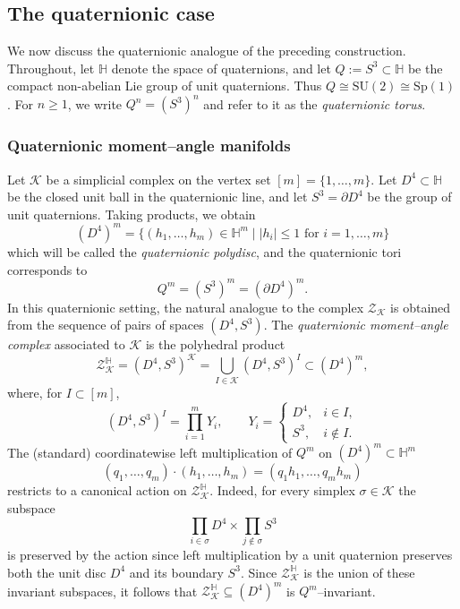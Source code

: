 \documentclass[11pt,a4paper]{article}
\numberwithin{equation}{section}
\theoremstyle{named}
\begin{document}
\subsection{The quaternionic case}
\label{subsec:quaternionic_case}

We now discuss the quaternionic analogue of the preceding construction. Throughout, let $\mathbb H$ denote the space of quaternions, and let $Q:=S^3\subset \mathbb H$ be the compact non-abelian Lie group of unit quaternions. Thus $Q\cong \mathrm{SU}(2)\cong \mathrm{Sp}(1)$. For $n\ge 1$, we write $Q^n=(S^3)^n$ and refer to it as the \emph{quaternionic torus}. 


\subsubsection{Quaternionic moment--angle manifolds}
\label{sec:moment_angle_H}

Let \(\mathcal K\) be a simplicial complex on the vertex set \([m]=\{1,\ldots,m\}\). Let \(D^4\subset \mathbb H\) be the closed unit ball in the quaternionic line, and let \(S^3=\partial D^4\) be the group of unit quaternions. Taking products, we obtain  
\[
(D^4)^m = \{(h_1,\dots,h_m)\in \mathbb H^m \mid |h_i|\le 1 \text{ for } i=1,\dots,m\}
\]
\noindent which will be called the \emph{quaternionic polydisc}, and the quaternionic tori corresponds to
\[
Q^m = (S^3)^m = (\partial D^4)^m.
\]
In this quaternionic setting, the natural analogue to the complex $\mathcal Z_{\mathcal K}$ is obtained from the sequence of pairs of spaces $(D^{4}, S^{3})$. The \emph{quaternionic moment--angle complex}
associated to \(\mathcal K\) is the polyhedral product
\[
    \mathcal Z_{\mathcal K}^{\mathbb H}
    =
    (D^4,S^3)^{\mathcal K}
    =
    \bigcup_{I\in \mathcal K}(D^4,S^3)^I
    \subset (D^4)^m,
\]
where, for \(I\subset[m]\),
\[
    (D^4,S^3)^I
    =
    \prod_{i=1}^{m}Y_i,
    \qquad
    Y_i=
    \begin{cases}
    D^4, & i\in I,\\
    S^3, & i\notin I.
    \end{cases}
\]
\noindent 
The (standard) coordinatewise left multiplication of $Q^m$ on $(D^4)^m\subset\mathbb H^m$ 
$$(q_1,\ldots,q_m)\cdot(h_1,\ldots,h_m) = (q_1h_1,\ldots,q_mh_m)$$
restricts to a canonical action on $\mathcal Z_{\mathcal K}^{\mathbb H}$. Indeed, for every simplex $\sigma\in\mathcal K$ the subspace
\[
\prod_{i\in \sigma}D^4
\times
\prod_{j\notin \sigma}S^3
\]
is preserved by the action since left multiplication by a unit quaternion preserves both the unit disc $D^4$ and its boundary $S^3$. Since $\mathcal Z_{\mathcal K}^{\mathbb H}$ is the union of these invariant subspaces, it follows that $\mathcal Z_{\mathcal K}^{\mathbb H} \subseteq (D^{4})^{m}$ is $Q^m$--invariant.
\end{document}
